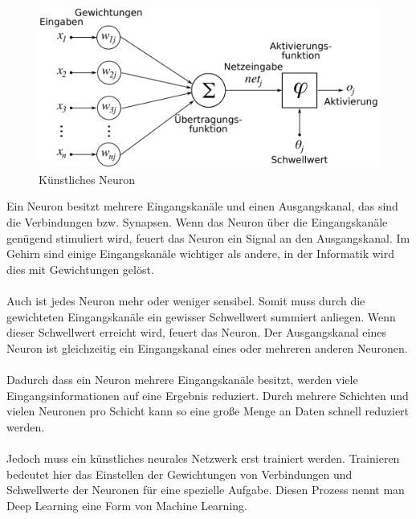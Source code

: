 \documentclass[12pt,oneside,a4paper,parskip]{scrbook}
\begin{document}
\begin{figure}[ht]
	\begin{center}
		\includegraphics[width=12cm]{Bilder/ArtificialNeuronModel_deutsch.png}
		\caption{Künstliches Neuron}
		\label{fig:wikiNeuron}
	\end{center}
\end{figure}

Ein Neuron besitzt mehrere Eingangskanäle 
und einen Ausgangskanal, das sind die Verbindungen bzw. Synapsen. Wenn das Neuron über die Eingangskanäle genügend stimuliert wird,
feuert das Neuron ein Signal 
an den Ausgangskanal. Im Gehirn sind einige Eingangskanäle wichtiger als andere, in der Informatik wird dies mit Gewichtungen gelöst. 
\\\\
Auch ist jedes Neuron mehr oder weniger sensibel. Somit muss durch die gewichteten Eingangskanäle 
ein gewisser Schwellwert summiert anliegen.
Wenn dieser Schwellwert 
erreicht wird, feuert das Neuron.
Der Ausgangskanal eines Neuron ist gleichzeitig ein Eingangskanal eines oder mehreren anderen Neuronen.
\\\\
Dadurch dass ein Neuron mehrere Eingangskanäle besitzt, werden viele Eingangsinformationen auf eine Ergebnis reduziert. Durch mehrere Schichten und vielen Neuronen pro Schicht kann so eine große Menge an Daten schnell reduziert werden. 
\\\\
Jedoch muss ein künstliches neurales Netzwerk erst trainiert werden. Trainieren bedeutet hier das Einstellen der Gewichtungen von Verbindungen und Schwellwerte der Neuronen für eine spezielle Aufgabe. Diesen Prozess nennt man Deep Learning eine Form von Machine Learning.
\end{document}
